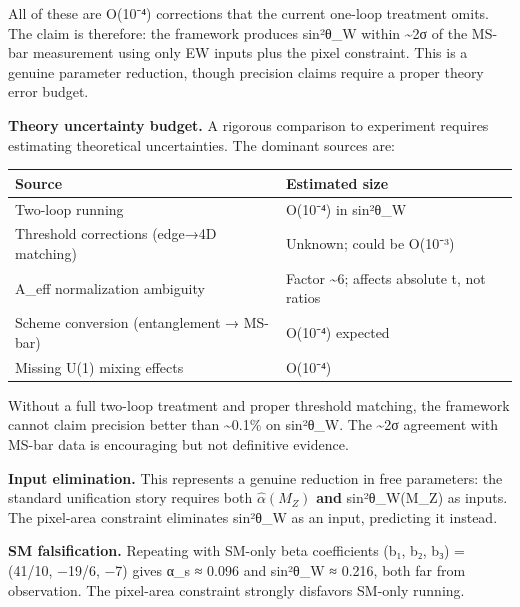 \documentclass[11pt,a4paper]{article}
\theoremstyle{remark}
\begin{document}
All of these are O(10⁻⁴) corrections that the current one-loop treatment
omits. The claim is therefore: the framework produces sin²θ\_W within \textasciitilde2σ
of the MS-bar measurement using only EW inputs plus the pixel constraint.
This is a genuine parameter reduction, though precision claims require a
proper theory error budget.

\textbf{Theory uncertainty budget.} A rigorous comparison to experiment requires
estimating theoretical uncertainties. The dominant sources are:

{\def\LTcaptype{none} %
\begin{longtable}[]{@{}
  >{\raggedright\arraybackslash}p{}
  >{\raggedright\arraybackslash}p{}@{}}
\toprule\noalign{}
\begin{minipage}[b]{\linewidth}\raggedright
Source
\end{minipage} & \begin{minipage}[b]{\linewidth}\raggedright
Estimated size
\end{minipage} \\
\midrule\noalign{}
\endhead
\bottomrule\noalign{}
\endlastfoot
Two-loop running & O(10⁻⁴) in sin²θ\_W \\
Threshold corrections (edge→4D matching) & Unknown; could be O(10⁻³) \\
A\_eff normalization ambiguity & Factor \textasciitilde6; affects absolute t, not ratios \\
Scheme conversion (entanglement → MS-bar) & O(10⁻⁴) expected \\
Missing U(1) mixing effects & O(10⁻⁴) \\
\end{longtable}
}

Without a full two-loop treatment and proper threshold matching, the
framework cannot claim precision better than \textasciitilde0.1\% on sin²θ\_W. The \textasciitilde2σ
agreement with MS-bar data is encouraging but not definitive evidence.

\textbf{Input elimination.} This represents a genuine reduction in free parameters:
the standard unification story requires both \(\hat{\alpha}(M_Z)\) \textbf{and}
sin²θ\_W(M\_Z) as inputs. The pixel-area constraint eliminates sin²θ\_W as an
input, predicting it instead.

\textbf{SM falsification.} Repeating with SM-only beta coefficients
(b₁, b₂, b₃) = (41/10, −19/6, −7) gives α\_s ≈ 0.096 and sin²θ\_W ≈ 0.216,
both far from observation. The pixel-area constraint strongly disfavors
SM-only running.
\end{document}
